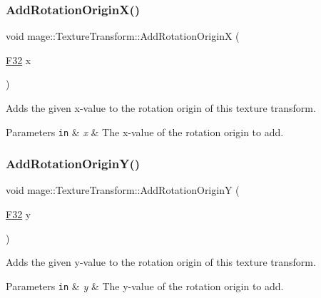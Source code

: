 \subsubsection{\texorpdfstring{Add\+Rotation\+Origin\+X()}{AddRotationOriginX()}}
{\footnotesize\ttfamily void mage\+::\+Texture\+Transform\+::\+Add\+Rotation\+OriginX (\begin{DoxyParamCaption}\item[{\hyperlink{namespacemage_aa97e833b45f06d60a0a9c4fc22ae02c0}{F32}}]{x }\end{DoxyParamCaption})\hspace{0.3cm}{\ttfamily [noexcept]}}

Adds the given x-\/value to the rotation origin of this texture transform.


\begin{DoxyParams}[1]{Parameters}
\mbox{\tt in}  & {\em x} & The x-\/value of the rotation origin to add. \\
\hline
\end{DoxyParams}
\hypertarget{classmage_1_1_texture_transform_a5d3dd574b9471f4ae1162819abc394bf}{}\label{classmage_1_1_texture_transform_a5d3dd574b9471f4ae1162819abc394bf} 
\subsubsection{\texorpdfstring{Add\+Rotation\+Origin\+Y()}{AddRotationOriginY()}}
{\footnotesize\ttfamily void mage\+::\+Texture\+Transform\+::\+Add\+Rotation\+OriginY (\begin{DoxyParamCaption}\item[{\hyperlink{namespacemage_aa97e833b45f06d60a0a9c4fc22ae02c0}{F32}}]{y }\end{DoxyParamCaption})\hspace{0.3cm}{\ttfamily [noexcept]}}

Adds the given y-\/value to the rotation origin of this texture transform.


\begin{DoxyParams}[1]{Parameters}
\mbox{\tt in}  & {\em y} & The y-\/value of the rotation origin to add. \\
\hline
\end{DoxyParams}
\hypertarget{classmage_1_1_texture_transform_a494965e060dd40a1c86f5493d734c1a7}{}\label{classmage_1_1_texture_transform_a494965e060dd40a1c86f5493d734c1a7} 
